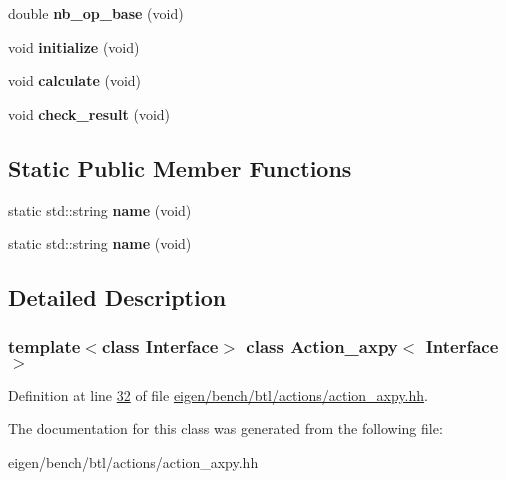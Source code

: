 \begin{DoxyCompactItemize}
double {\bfseries nb\+\_\+op\+\_\+base} (void)
\item 
\mbox{\label{class_action__axpy_a7ce00fdc6b6fe827efac91dd64e8ace9}} 
void {\bfseries initialize} (void)
\item 
\mbox{\label{class_action__axpy_abd728290c46deced00f78948e0e9814f}} 
void {\bfseries calculate} (void)
\item 
\mbox{\label{class_action__axpy_aa7e99f2d942661c579dd1c04521e4212}} 
void {\bfseries check\+\_\+result} (void)
\end{DoxyCompactItemize}
\subsection*{Static Public Member Functions}
\begin{DoxyCompactItemize}
\item 
\mbox{\label{class_action__axpy_ae6fbbbf70626346d4c69129abe72caf7}} 
static std\+::string {\bfseries name} (void)
\item 
\mbox{\label{class_action__axpy_ae6fbbbf70626346d4c69129abe72caf7}} 
static std\+::string {\bfseries name} (void)
\end{DoxyCompactItemize}


\subsection{Detailed Description}
\subsubsection*{template$<$class Interface$>$\newline
class Action\+\_\+axpy$<$ Interface $>$}



Definition at line \hyperlink{eigen_2bench_2btl_2actions_2action__axpy_8hh_source_l00032}{32} of file \hyperlink{eigen_2bench_2btl_2actions_2action__axpy_8hh_source}{eigen/bench/btl/actions/action\+\_\+axpy.\+hh}.



The documentation for this class was generated from the following file\+:\begin{DoxyCompactItemize}
\item 
eigen/bench/btl/actions/action\+\_\+axpy.\+hh\end{DoxyCompactItemize}

